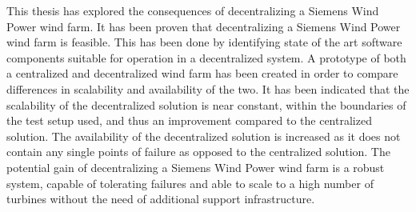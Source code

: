 This thesis has explored the consequences of decentralizing a Siemens Wind Power wind farm. It has been proven that decentralizing a Siemens Wind Power wind farm is feasible. This has been done by identifying state of the art software components suitable for operation in a decentralized system. A prototype of both a centralized and decentralized wind farm has been created in order to compare differences in scalability and availability of the two. It has been indicated that the scalability of the decentralized solution is near constant, within the boundaries of the test setup used, and thus an improvement compared to the centralized solution. The availability of the decentralized solution is increased as it does not contain any single points of failure as opposed to the centralized solution. The potential gain of decentralizing a Siemens Wind Power wind farm is a robust system, capable of tolerating failures and able to scale to a high number of turbines without the need of additional support infrastructure.